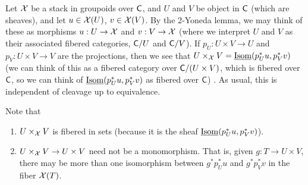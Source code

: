  \begin{example} \label{lec27Eg:UxV_Isom}
   Let $\mathcal{X}$ be a stack in groupoids over $\text{\sf C}$, and $U$ and $V$ be object in $\text{\sf C}$ (which
   are sheaves), and let $u\in \mathcal{X}(U)$, $v\in \mathcal{X}(V)$. By the 2-Yoneda lemma, we may think
   of these as morphisms $u:U\to \mathcal{X}$ and $v:V\to \mathcal{X}$ (where we interpret $U$ and $V$ as
   their associated fibered categories, $\text{\sf C}/U$ and $\text{\sf C}/V$). If $p_U:U\times V\to U$ and
   $p_V:U\times V\to V$ are the projections, then we see that $U\times_{\mathcal{X}} V =
   \operatorname{\underline{Isom}}(p_U^*u,p_V^*v)$ (we can think of this as a fibered category over $\text{\sf C}/(U\times
   V)$, which is fibered over $\text{\sf C}$, so we can think of $\operatorname{\underline{Isom}}(p_U^*u,p_V^*v)$ as fibered
   over $\text{\sf C}$) . As usual, this is independent of
   cleavage up to equivalence.

%
%
   Note that
   \begin{enumerate}
     \item $U\times_{\mathcal{X}} V$ is fibered in sets (because it is the sheaf
      $\operatorname{\underline{Isom}}(p_U^*u,p_V^*v)$).
     \item $U\times_{\mathcal{X}} V\to U\times V$ need not be a monomorphism. That is,
      given $g:T\to U\times V$, there may be more than one isomorphism between
      $g^*p_U^*u$ and $g^*p_V^*v$ in the fiber $\mathcal{X}(T)$.
      \qedhere
   \end{enumerate}
 \end{example}


